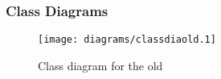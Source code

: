 \subsubsection{Class Diagrams} %
\label{ssub:classdiagramsold}

\begin{figure}[htbp]
  \centering
    \texttt{[image: diagrams/classdiaold.1]}
  \caption{Class diagram for the old }
  \label{fig:classdiagramsold}
\end{figure}

